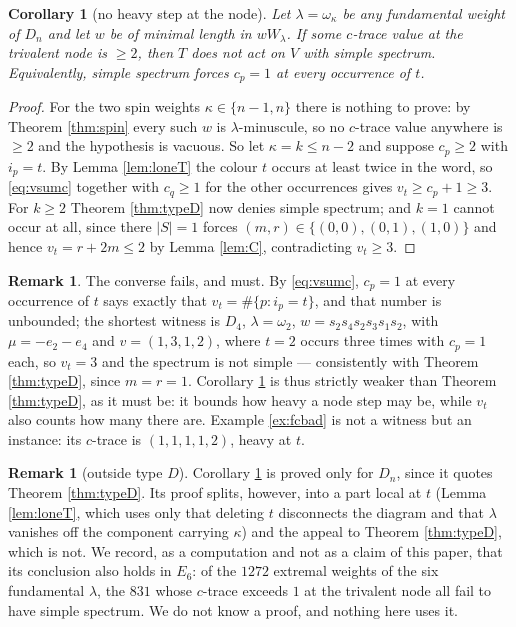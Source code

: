 \documentclass[reqno]{amsart}
\theoremstyle{plain}
\newtheorem{corollary}[theorem]{Corollary}
\theoremstyle{definition}
\newtheorem{remark}[theorem]{Remark}
\newcommand{\la}{\lambda}
\newcommand{\om}{\omega}
\newcommand{\ka}{\kappa}
\begin{document}
\begin{corollary}[no heavy step at the node]\label{cor:nodeone}
Let $\la=\om_\ka$ be \emph{any} fundamental weight of $D_n$ and let $w$ be of
minimal length in $wW_\la$.  If some $c$-trace value at the trivalent node is
$\ge2$, then $T$
does not act on $V$ with simple spectrum.  Equivalently, simple spectrum forces
$c_p=1$ at \emph{every} occurrence of $t$.
\end{corollary}

\begin{proof}
For the two spin weights $\ka\in\{n-1,n\}$ there is nothing to prove: by
Theorem \ref{thm:spin} every such $w$ is $\la$-minuscule, so no $c$-trace value
anywhere is $\ge2$ and the hypothesis is vacuous.  So let $\ka=k\le n-2$ and
suppose $c_p\ge2$ with $i_p=t$.  By Lemma \ref{lem:loneT} the colour $t$ occurs
at least twice in the word, so \eqref{eq:vsumc} together with $c_q\ge1$ for the
other occurrences gives $v_t\ge c_p+1\ge3$.  For $k\ge2$ Theorem
\ref{thm:typeD} now denies simple spectrum; and $k=1$ cannot occur at all,
since there $|S|=1$ forces $(m,r)\in\{(0,0),(0,1),(1,0)\}$ and hence
$v_t=r+2m\le2$ by Lemma \ref{lem:C}, contradicting $v_t\ge3$.
\end{proof}

\begin{remark}
The converse fails, and must.  By \eqref{eq:vsumc}, $c_p=1$ at every
occurrence of $t$ says exactly that $v_t=\#\{p:i_p=t\}$, and that number is
unbounded; the shortest witness is $D_4$, $\la=\om_2$, $w=s_2s_4s_2s_3s_1s_2$,
with $\mu=-e_2-e_4$ and $v=(1,3,1,2)$, where $t=2$ occurs three times with
$c_p=1$ each, so $v_t=3$ and the spectrum is not simple --- consistently with
Theorem \ref{thm:typeD}, since $m=r=1$.  Corollary \ref{cor:nodeone} is thus
strictly weaker than Theorem \ref{thm:typeD}, as it must be: it bounds how
heavy a node step may be, while $v_t$ also counts how many there are.  Example
\ref{ex:fcbad} is not a witness but an instance: its $c$-trace is
$(1,1,1,1,2)$, heavy at $t$.
\end{remark}

\begin{remark}[outside type $D$]
Corollary \ref{cor:nodeone} is proved only for $D_n$, since it quotes Theorem
\ref{thm:typeD}.  Its proof splits, however, into a part local at $t$ (Lemma
\ref{lem:loneT}, which uses only that deleting $t$ disconnects the diagram and
that $\la$ vanishes off the component carrying $\ka$) and the appeal to
Theorem \ref{thm:typeD}, which is not.  We record, as a computation and not as
a claim of this paper, that its conclusion also holds in $E_6$: of the $1272$
extremal weights of the six fundamental $\la$, the $831$ whose $c$-trace
exceeds $1$ at the trivalent node all fail to have simple spectrum.  We do not
know a proof, and nothing here uses it.
\end{remark}
\end{document}
